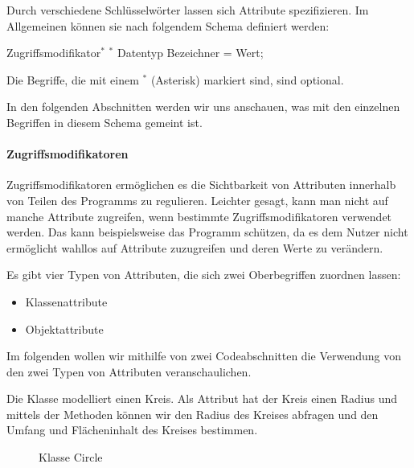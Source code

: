 \documentclass{tuda-pub}
\begin{document}
  Durch verschiedene Schlüsselwörter lassen sich Attribute spezifizieren. Im Allgemeinen können
  sie nach folgendem Schema definiert werden:

  \begin{center}
    Zugriffsmodifikator\(^*\) \(^*\) Datentyp Bezeichner = Wert;
  \end{center}

  Die Begriffe, die mit einem \(^*\) (Asterisk) markiert sind, sind optional.

  \br

  In den folgenden Abschnitten werden wir uns anschauen, was mit den einzelnen Begriffen in
  diesem Schema gemeint ist.

  \paragraph{Zugriffsmodifikatoren}

  Zugriffsmodifikatoren ermöglichen es die Sichtbarkeit von Attributen innerhalb von Teilen des
  Programms zu regulieren. Leichter gesagt, kann man nicht auf manche Attribute zugreifen, wenn
  bestimmte Zugriffsmodifikatoren verwendet werden. Das kann beispielsweise das Programm
  schützen, da es dem Nutzer nicht ermöglicht wahllos auf Attribute zuzugreifen und deren Werte
  zu verändern.

  \br

  Es gibt vier Typen von Attributen, die sich zwei Oberbegriffen zuordnen lassen:

  \begin{itemize}
    \item Klassenattribute
    \item Objektattribute
  \end{itemize}

  Im folgenden wollen wir mithilfe von zwei Codeabschnitten die Verwendung von den zwei Typen von
  Attributen veranschaulichen.

  \br

  Die Klasse  modelliert einen Kreis. Als Attribut hat der Kreis einen Radius
  und mittels der Methoden können wir den Radius des Kreises abfragen und den Umfang und
  Flächeninhalt des Kreises bestimmen.

  \begin{figure}[h]
    \centering
    
    \caption{Klasse Circle}
    \label{fig:Circle}
  \end{figure}
\end{document}
